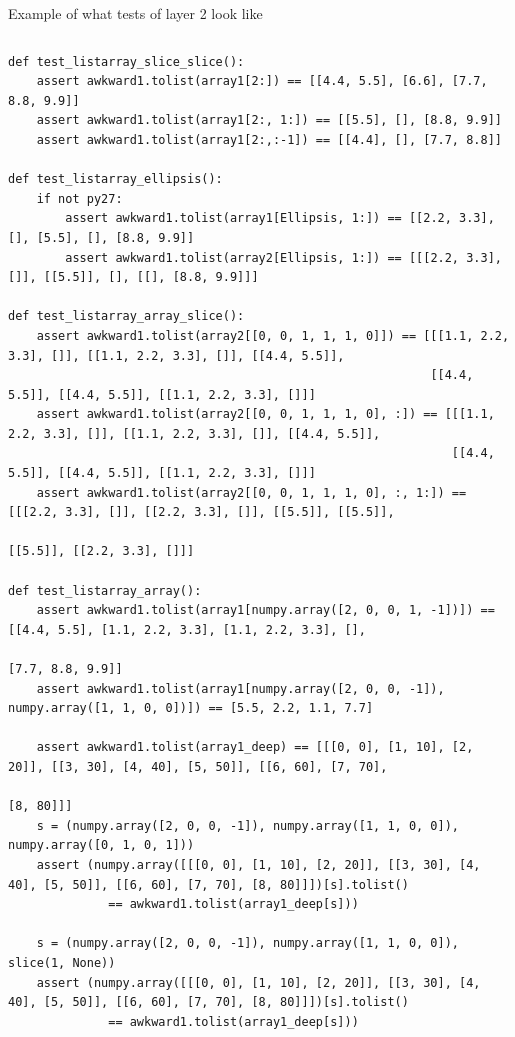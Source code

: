 \documentclass[aspectratio=169]{beamer}
\begin{document}
\begin{frame}[fragile]{Example of what tests of layer 2 look like}
\tiny
\vspace{0.05 cm}
\begin{columns}
\begin{verbatim}
def test_listarray_slice_slice():
    assert awkward1.tolist(array1[2:]) == [[4.4, 5.5], [6.6], [7.7, 8.8, 9.9]]
    assert awkward1.tolist(array1[2:, 1:]) == [[5.5], [], [8.8, 9.9]]
    assert awkward1.tolist(array1[2:,:-1]) == [[4.4], [], [7.7, 8.8]]

def test_listarray_ellipsis():
    if not py27:
        assert awkward1.tolist(array1[Ellipsis, 1:]) == [[2.2, 3.3], [], [5.5], [], [8.8, 9.9]]
        assert awkward1.tolist(array2[Ellipsis, 1:]) == [[[2.2, 3.3], []], [[5.5]], [], [[], [8.8, 9.9]]]

def test_listarray_array_slice():
    assert awkward1.tolist(array2[[0, 0, 1, 1, 1, 0]]) == [[[1.1, 2.2, 3.3], []], [[1.1, 2.2, 3.3], []], [[4.4, 5.5]],
                                                           [[4.4, 5.5]], [[4.4, 5.5]], [[1.1, 2.2, 3.3], []]]
    assert awkward1.tolist(array2[[0, 0, 1, 1, 1, 0], :]) == [[[1.1, 2.2, 3.3], []], [[1.1, 2.2, 3.3], []], [[4.4, 5.5]],
                                                              [[4.4, 5.5]], [[4.4, 5.5]], [[1.1, 2.2, 3.3], []]]
    assert awkward1.tolist(array2[[0, 0, 1, 1, 1, 0], :, 1:]) == [[[2.2, 3.3], []], [[2.2, 3.3], []], [[5.5]], [[5.5]],
                                                                  [[5.5]], [[2.2, 3.3], []]]

def test_listarray_array():
    assert awkward1.tolist(array1[numpy.array([2, 0, 0, 1, -1])]) == [[4.4, 5.5], [1.1, 2.2, 3.3], [1.1, 2.2, 3.3], [],
                                                                      [7.7, 8.8, 9.9]]
    assert awkward1.tolist(array1[numpy.array([2, 0, 0, -1]), numpy.array([1, 1, 0, 0])]) == [5.5, 2.2, 1.1, 7.7]

    assert awkward1.tolist(array1_deep) == [[[0, 0], [1, 10], [2, 20]], [[3, 30], [4, 40], [5, 50]], [[6, 60], [7, 70],
                                                                                                      [8, 80]]]
    s = (numpy.array([2, 0, 0, -1]), numpy.array([1, 1, 0, 0]), numpy.array([0, 1, 0, 1]))
    assert (numpy.array([[[0, 0], [1, 10], [2, 20]], [[3, 30], [4, 40], [5, 50]], [[6, 60], [7, 70], [8, 80]]])[s].tolist()
              == awkward1.tolist(array1_deep[s]))

    s = (numpy.array([2, 0, 0, -1]), numpy.array([1, 1, 0, 0]), slice(1, None))
    assert (numpy.array([[[0, 0], [1, 10], [2, 20]], [[3, 30], [4, 40], [5, 50]], [[6, 60], [7, 70], [8, 80]]])[s].tolist()
              == awkward1.tolist(array1_deep[s]))
\end{verbatim}
\end{columns}
\end{frame}
\end{document}
